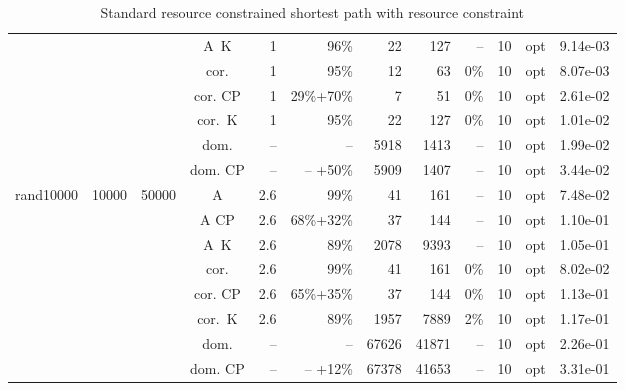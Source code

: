 \documentclass[11pt]{amsart}
\newenvironment{outdent}
{\begin{list}{}{\leftmargin-2cm\rightmargin\leftmargin}\centering\item\relax}
{\end{list}\ignorespacesafterend}
\theoremstyle{plain}
\theoremstyle{remark}
\begin{document}
\begin{table}
\begin{outdent}
\begin{footnotesize}
\begin{tabular}{|l|rrc|rr|rrr|rr|r|}
&&&A~K & 1 & 96\% &22 & 127 & -- &10 & opt & 9.14e-03 \\
&&&cor. & 1 & 95\% &12 & 63 & 0\% &10 & opt & 8.07e-03 \\
&&&cor. CP & 1 & 29\%+70\% &7 & 51 & 0\% &10 & opt & 2.61e-02 \\
&&&cor.~K & 1 & 95\% &22 & 127 & 0\% &10 & opt & 1.01e-02 \\
&&&dom. & -- & --  &5918 & 1413 & -- &10 & opt & 1.99e-02 \\
&&&dom. CP & -- & -- +50\% &5909 & 1407 & -- &10 & opt & 3.44e-02 \\
\hline
rand10000 & 10000 & 50000 & A & 2.6 & 99\% &41 & 161 & -- &10 & opt & 7.48e-02 \\
&&&A CP & 2.6 & 68\%+32\% &37 & 144 & -- &10 & opt & 1.10e-01 \\
&&&A~K & 2.6 & 89\% &2078 & 9393 & -- &10 & opt & 1.05e-01 \\
&&&cor. & 2.6 & 99\% &41 & 161 & 0\% &10 & opt & 8.02e-02 \\
&&&cor. CP & 2.6 & 65\%+35\% &37 & 144 & 0\% &10 & opt & 1.13e-01 \\
&&&cor.~K & 2.6 & 89\% &1957 & 7889 & 2\% &10 & opt & 1.17e-01 \\
&&&dom. & -- & --  &67626 & 41871 & -- &10 & opt & 2.26e-01 \\
&&&dom. CP & -- & -- +12\% &67378 & 41653 & -- &10 & opt & 3.31e-01 \\
\hline
\end{tabular}
\end{footnotesize}
\end{outdent}
\caption{Standard resource constrained shortest path with  resource constraint}
\label{tab:RCSP1constraint}
\end{table}
\end{document}
